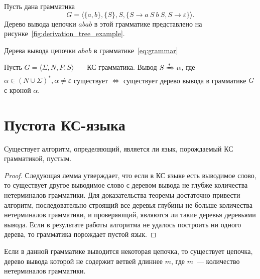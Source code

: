 \begin{example}
    Пусть дана грамматика
    \begin{equation}
        G = \langle \{a,b\}, \{S\}, S, \{S \to a \ S \ b \ S, S \to \varepsilon\} \rangle.\label{eq:grammar}
    \end{equation}
    Дерево вывода цепочки $abab$ в этой грамматике представлено на рисунке~\ref{fig:derivation_tree_example}. 
    
    \begin{marginfigure}
        \begin{center}
            \resizebox{\marginparwidth}{!}{}
        \end{center}
        \caption{Дерева вывода цепочки $abab$ в грамматике~\ref{eq:grammar}}
        \label{fig:derivation_tree_example}
    \end{marginfigure}
    
\end{example}

\begin{theorem}
    Пусть $G = \langle \Sigma, N, P, S \rangle$~--- КС-грамматика.
    Вывод $S \derives \alpha$, где $\alpha \in (N \cup \Sigma)^*, \alpha \neq \varepsilon$ существует $\Leftrightarrow$ существует дерево вывода в грамматике $G$ с кроной $\alpha$.
\end{theorem}

\section{Пустота КС-языка}

\begin{theorem}
    Существует алгоритм, определяющий, является ли язык, порождаемый КС грамматикой, пустым.
\end{theorem}

\begin{proof}
    Следующая лемма утверждает, что если в КС языке есть выводимое слово, то существует другое выводимое слово с деревом вывода не глубже количества нетерминалов грамматики.
    Для доказательства теоремы достаточно привести алгоритм, последовательно строящий все деревья глубины не больше количества нетерминалов грамматики, и проверяющий, являются ли такие деревья деревьями вывода.
    Если в результате работы алгоритма не удалось построить ни одного дерева, то грамматика порождает пустой язык.
\end{proof}

\begin{lemma}
    Если в данной грамматике выводится некоторая цепочка, то существует цепочка, дерево вывода которой не содержит ветвей длиннее $m$, где $m$~--- количество нетерминалов грамматики.
\end{lemma}

